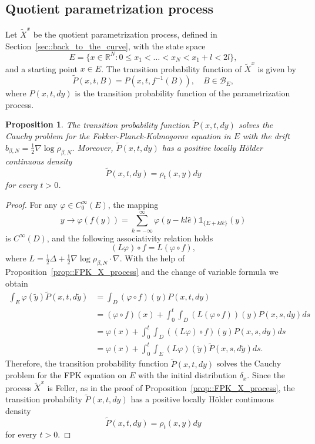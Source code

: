 \documentclass[11pt]{article}
\numberwithin{equation}{section}
\newtheorem{proposition}[theorem]{Proposition}
\theoremstyle{definition}
\begin{document}
\subsection{Quotient parametrization process}
Let $\tilde X^{x}$ be the quotient parametrization process, defined in Section~\ref{sec::back_to_the_curve}, with the state space  
\begin{equation}\label{eq:domain_E}
    E=\{x\in\mathbb{R}^{N}: 0\le x_{1} < \dots< x_{N}< x_{1}+l<2l\},
\end{equation}
and a starting point $x\in E$. The transition probability function of $\tilde X^{x}$ is given by 
\[
    \tilde P(x,t, B) = P(x,t,f^{-1}(B)), \quad B\in\mathcal{B}_{E},
\]
where $P(x,t,dy)$ is the transition probability function of the parametrization process.
\begin{proposition}\label{prop::FPK_quotient_param_process}
    The transition probability function $\tilde P(x,t,dy)$ solves the Cauchy problem for the Fokker-Planck-Kolmogorov equation in $E$ with the drift $b_{\beta,N}=\frac{1}{2}\nabla\log\rho_{\beta, N}$. Moreover, $\tilde P(x,t,dy)$ has a positive locally Hölder continuous density 
    \[
        \tilde P(x,t,dy) = \rho_{t}(x,y)dy
    \]
    for every $t>0$.
\end{proposition}
\begin{proof}
For any $\varphi \in C^{\infty}_{0}(E)$, the mapping 
\[
    y\to \varphi(f(y)) = \sum\limits_{k=-\infty}^{\infty} \varphi( y-kl\hat{e})\mathds{1}_{\{E+kl\hat{e}\}}(y)
\]
is $C^{\infty}(D)$, and the following associativity relation holds 
\[
    (L\varphi)\circ f = L(\varphi\circ f),
\]
where $L=\frac{1}{2}\Delta + \frac{1}{2}\nabla\log\rho_{\beta, N}\cdot\nabla$. With the help of Proposition~\ref{prop::FPK_X_process} and the change of variable formula we obtain
\begin{align*}
    \int_{E}\varphi(\tilde y)\tilde P(x,t, d\tilde y)  
    &=\int_{D}(\varphi\circ f)(y)P(x,t,dy)\\
    &= (\varphi\circ f)(x) + \int_{0}^{t}\int_{D}(L(\varphi\circ f))(y)P(x,s,dy)ds\\
    &=\varphi(x) + \int_{0}^{t}\int_{D}((L\varphi)\circ f)(y)P(x,s,dy)ds\\
    &=\varphi(x) + \int_{0}^{t}\int_{E}(L\varphi)(\tilde y)\tilde P(x,s,d\tilde y)ds.
\end{align*}
Therefore, the transition probability function $\tilde P(x,t,dy)$ solves the Cauchy problem for the  FPK equation on $E$ with the initial distribution $\delta_{x}$. Since the process $\tilde X^{x}$ is Feller, as in the proof of Proposition~\ref{prop::FPK_X_process}, the transition probability $\tilde P(x,t,dy)$ has a positive locally Hölder continuous density 
\[
    \tilde P(x,t,dy) = \rho_{t}(x,y)dy
\]
for every $t>0$.
\end{proof}
\end{document}
